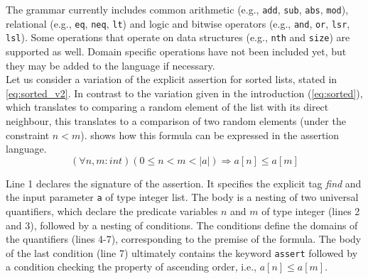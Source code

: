 The grammar currently includes common arithmetic (e.g., \texttt{add}, \texttt{sub}, \texttt{abs}, \texttt{mod}), relational  (e.g., \texttt{eq}, \texttt{neq}, \texttt{lt}) and logic and bitwise operators (e.g., \texttt{and}, \texttt{or}, \texttt{lsr}, \texttt{lsl}). Some operations that operate on data structures (e.g., \texttt{nth} and \texttt{size}) are supported as well. Domain specific operations have not been included yet, but they may be added to the language if necessary. \\

Let us consider a variation of the explicit assertion for sorted lists, stated in \eqref{eq:sorted_v2}. In contrast to the variation given in the introduction (\eqref{eq:sorted}), which translates to comparing a random element of the list with its direct neighbour, this translates to a comparison of two random elements (under the constraint $n < m$).  shows how this formula can be expressed in the assertion language.
\begin{equation}\label{eq:sorted_v2}
	(\forall n,m : int) (0 \leq n < m < |a|) \Rightarrow a[n] \leq a[m]
\end{equation}


Line 1 declares the signature of the assertion. It specifies the explicit tag \textit{find} and the input parameter \texttt{a} of type integer list. The body is a nesting of two universal quantifiers, which declare the predicate variables $n$ and $m$ of type integer (lines 2 and 3), followed by a nesting of conditions. The conditions define the domains of the quantifiers (lines 4-7), corresponding to the premise of the formula. The body of the last condition (line 7) ultimately contains the keyword \texttt{assert} followed by a condition checking the property of ascending order, i.e.,  $a[n] \leq a[m]$.

